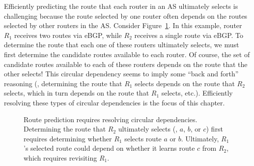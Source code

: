 Efficiently predicting the route that each router in an AS ultimately
selects is challenging because the route selected by one router often
depends on the routes selected by other routers in the AS.  Consider
Figure~\ref{fig:simple}. In this example, router $R_1$ receives two
routes via eBGP, while $R_2$ receives a single route via eBGP.  To
determine the route that each one of these routers ultimately selects,
we must first determine the candidate routes available to each router.
Of course, the set of candidate routes available to each of these routers
depends on the route that the other selects!  This circular dependency
seems to imply some ``back and forth'' reasoning (\ie, determining the
route that $R_1$ selects depends on the route that $R_2$ selects, which
in turn depends on the route that $R_1$ selects, etc.).  Efficiently
resolving these types of circular dependencies is the focus of this
chapter.
%
\vspace{0.15in}
\begin{center}
\end{center}
\vspace{0.15in}


\begin{figure}
\begin{center}
\begin{psfrags}
\end{psfrags}
\end{center}
\caption[Route prediction requires resolving circular
dependencies.]{Route prediction requires resolving circular
dependencies.  Determining the route that $R_2$ ultimately selects (\ie,
$a$, $b$, or $c$) first requires determining whether $R_1$ selects route
$a$ or $b$.  Ultimately, $R_1$'s selected route could depend on whether
it learns route $c$ from $R_2$, which requires revisiting $R_1$.
}
\label{fig:simple}
\end{figure}

